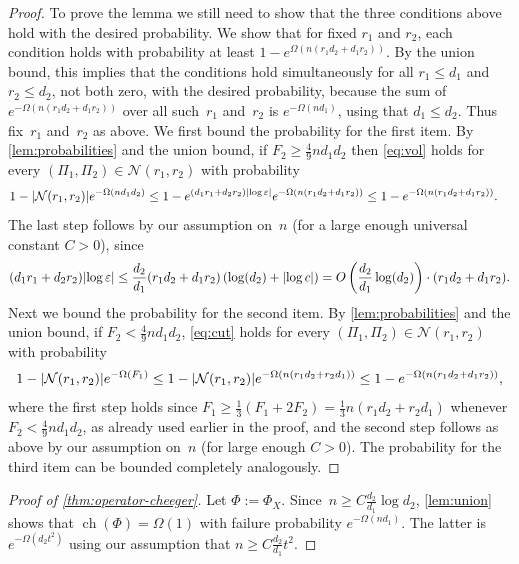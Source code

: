 \documentclass[aos]{imsart}
\theoremstyle{definition}
\numberwithin{equation}{section}
\DeclareMathOperator{\ch}{ch}
\DeclarePairedDelimiter{\abs}{\lvert}{\rvert}
\newcommand{\eps}{\varepsilon}
\newcommand{\cN}{\mathcal{N}}
\newcommand{\MW}[1]{{\color{red}[MW: #1]}}
\newcommand{\MW}[1]{{}}
\begin{document}
\begin{appendix}
\begin{proof}
To prove the lemma we still need to show that the three conditions above hold with the desired probability.
We show that for fixed $r_1$ and $r_2$, each condition holds with probability at least $1 - e^{\Omega(n (r_1 d_2 + d_1 r_2))}$.
By the union bound, this implies that the conditions hold simultaneously for all $r_1 \leq d_1$ and $r_2 \leq d_2$, not both zero, with the desired probability, because the sum of $e^{-\Omega(n (r_1 d_2 + d_1 r_2))}$ over all such~$r_1$ and~$r_2$ is $e^{- \Omega( n d_1)}$, using that $d_1 \leq d_2$.
Thus fix~$r_1$ and~$r_2$ as above.
We first bound the probability for the first item.
By \cref{lem:probabilities} and the union bound, if $F_2 \geq \frac49 n d_1 d_2$ then \cref{eq:vol} holds for every $(\Pi_1,\Pi_2) \in \cN(r_1, r_2)$ with probability
\begin{align*}
1 - \abs{\cN(r_1, r_2)} e^{- \Omega( n d_1 d_2) } &\leq 1 - e^{(d_1r_1 + d_2r_2) \abs{\log\eps}} e^{ - \Omega(n (r_1 d_2 + d_1 r_2))}
\leq 1 - e^{ - \Omega(n (r_1 d_2 + d_1 r_2))}.
\end{align*}
The last step follows by our assumption on~$n$ (for a large enough universal constant $C>0$), since
\begin{align*}
  (d_1r_1 + d_2r_2) \abs{\log\eps}
\leq \frac{d_2}{d_1}(r_1 d_2 + d_1 r_2) \left( \log(d_2) + \abs{\log c} \right)
= O\left(\frac{d_2}{d_1} \log(d_2) \right) \cdot (r_1 d_2 + d_1 r_2).
\end{align*}
Next we bound the probability for the second item.
By \cref{lem:probabilities} and the union bound, if $F_2 < \frac49 n d_1 d_2$, \cref{eq:cut} holds for every $(\Pi_1,\Pi_2) \in \cN(r_1, r_2)$ with probability
\begin{align*}
  1 - \abs{\cN(r_1, r_2)} e^{-\Omega(F_1)}
\leq 1 - \abs{\cN(r_1, r_2)} e^{-\Omega(n (r_1 d_2 + r_2 d_1))}
\leq 1 - e^{ - \Omega(n (r_1 d_2 + d_1 r_2))},
\end{align*}
where the first step holds since $F_1 \geq \frac{1}{3} (F_1 + 2 F_2) = \frac13 n (r_1 d_2 + r_2 d_1)$ whenever $F_2 < \frac49 n d_1 d_2$, as already used earlier in the proof, and the second step follows as above by our assumption on~$n$ (for large enough $C>0$).
The probability for the third item can be bounded completely analogously.
\end{proof}

\begin{proof}[Proof of \cref{thm:operator-cheeger}]
Let $\Phi:=\Phi_X$.
Since~$n \geq C \frac{d_2}{d_1} \log d_2$, \cref{lem:union} shows that $\ch(\Phi) = \Omega(1)$ with failure probability $e^{- \Omega(n d_1)}$.
The latter is $e^{- \Omega(d_2 t^2)}$ using our assumption that $n \geq C \frac{d_2}{d_1} t^2$.


\end{proof}
\end{appendix}
\end{document}

